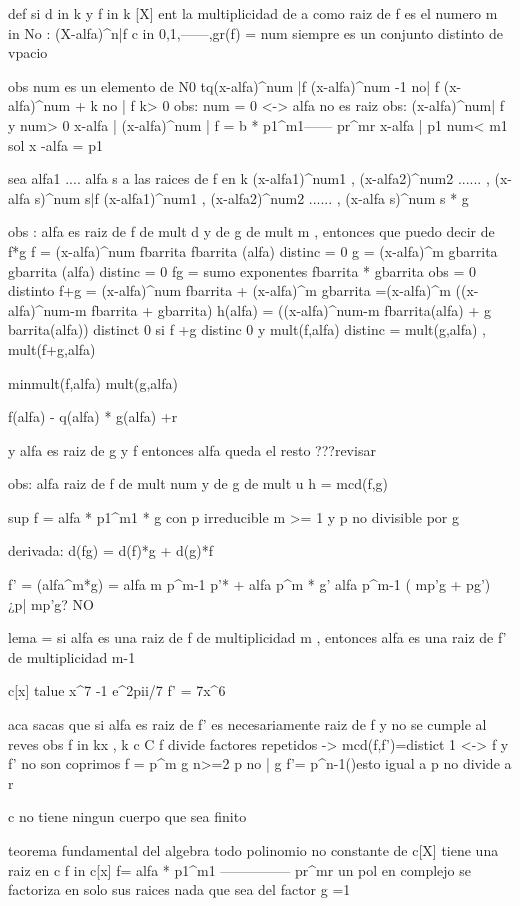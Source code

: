 def si d in k y f in k [X] ent la multiplicidad de a como raiz de f es el  numero {m in No : (X-alfa)^n|f}
c in {0,1,------,gr(f)} = num
siempre es un conjunto distinto de vpacio

obs num es un elemento de N0
tq(x-alfa)^num |f
(x-alfa)^num -1 no| f 
(x-alfa)^num + k no | f  k> 0 
obs:
num = 0 <-> alfa no es raiz 
obs:
(x-alfa)^num| f y num> 0 
x-alfa | (x-alfa)^num | f = b * p1^m1------ pr^mr 
x-alfa | p1
num< m1 
sol x -alfa = p1 

sea alfa1 .... alfa s a las raices de f en k 
(x-alfa1)^num1 , (x-alfa2)^num2 ...... , (x-alfa s)^num s|f
(x-alfa1)^num1 , (x-alfa2)^num2 ...... , (x-alfa s)^num s * g 

obs : alfa es raiz de f de mult d y de g de mult m , entonces que puedo decir de f*g 
f = (x-alfa)^num fbarrita fbarrita (alfa) distinc = 0 
g = (x-alfa)^m gbarrita gbarrita (alfa) distinc = 0 
fg = sumo exponentes fbarrita * gbarrita
obs = 0 distinto f+g = (x-alfa)^num fbarrita + (x-alfa)^m gbarrita
=(x-alfa)^m ((x-alfa)^num-m fbarrita + gbarrita)
h(alfa) = ((x-alfa)^num-m fbarrita(alfa) + g barrita(alfa)) distinct 0 
si f +g distinc 0 y mult(f,alfa) distinc = mult(g,alfa) , 
mult(f+g,alfa)

min{mult(f,alfa) mult(g,alfa)}

f(alfa) - q(alfa) * g(alfa) +r 

y alfa es raiz de g y f entonces alfa queda el resto ???revisar

obs: alfa raiz de f de mult num y de g de mult u
h = mcd(f,g)



sup f = alfa * p1^m1 * g con p irreducible m >= 1 
y p no divisible por g 

derivada:
d(fg) = d(f)*g + d(g)*f 

f' = (alfa^m*g) = alfa m p^m-1 p'* + alfa p^m * g' 
alfa p^m-1 ( mp'g + pg')
¿p| mp'g? NO 

lema = si alfa es una raiz de f de multiplicidad  m , entonces alfa es una raiz de f' de multiplicidad m-1 


c[x] talue x^7  -1 e^2pii/7
f' = 7x^6 

aca sacas que si alfa es raiz de f' es necesariamente raiz de f y no se cumple al reves
obs f in k{x} , k c C 
f divide factores repetidos -> mcd(f,f')=distict 1 
<-> f y f' no son coprimos 
f = p^m g n>=2 
p no | g f'= p^n-1(){esto igual a p no divide a r}

c no tiene ningun cuerpo que sea finito 


teorema fundamental del algebra todo polinomio no constante de c[X] tiene una raiz en c 
f in c[x] f= alfa * p1^m1 --------------- pr^mr 
un pol en complejo se factoriza en solo sus raices nada que sea del factor g =1 


